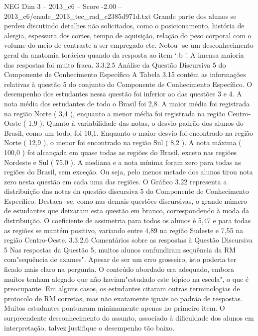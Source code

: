 \begin{textsample}{NEG Dim 3 – 2013\_c6 – Score -2.00 – 2013\_c6/enade\_2013\_tec\_rad\_c2385d971d.txt}
Grande parte dos alunos se perdeu discutindo detalhes não solicitados, como o posicionamento, história de alergia, espessura dos cortes, tempo de aquisição, relação do peso corporal com o volume do meio de contraste a ser empregado etc.
Notou -se um desconhecimento geral da anatomia torácica quando da resposta ao item ‘ b ’.
A imensa maioria das respostas foi muito fraca. 3.3.2.5 Análise da Questão Discursiva 5 do Componente de Conhecimento Específico A Tabela 3.15 contém as informações relativas à questão 5 do conjunto do Componente de Conhecimento Específico.
O desempenho dos estudantes nessa questão foi inferior ao das questões 3 e 4.
A nota média dos estudantes de todo o Brasil foi 2,8.
A maior média foi registrada na região Norte ( 3,4 ), enquanto a menor média foi registrada na região Centro-Oeste ( 1,9 ).
Quanto à variabilidade das notas, o desvio padrão dos alunos do Brasil, como um todo, foi 10,1.
Enquanto o maior desvio foi encontrado na região Norte ( 12,9 ), o menor foi encontrado na região Sul ( 8,2 ).
A nota máxima ( 100,0 ) foi alcançada em quase todas as regiões do Brasil, exceto nas regiões Nordeste e Sul ( 75,0 ).
A mediana e a nota mínima foram zero para todas as regiões do Brasil, sem exceção.
Ou seja, pelo menos metade dos alunos tirou nota zero nesta questão em cada uma das regiões.
O Gráfico 3.22 representa a distribuição das notas da questão discursiva 5 do Componente de Conhecimento Específico.
Destaca -se, como nas demais questões discursivas, o grande número de estudantes que deixaram esta questão em branco, correspondendo à moda da distribuição.
O coeficiente de assimetria para todos os alunos é 5,47 e para todas as regiões se mantém positivo, variando entre 4,89 na região Sudeste e 7,55 na região Centro-Oeste. 3.3.2.6 Comentários sobre as respostas à Questão Discursiva 5 Nas respostas da Questão 5, muitos alunos confundiram sequência da RM com"sequência de exames".
Apesar de ser um erro grosseiro, isto poderia ter ficado mais claro na pergunta.
O conteúdo abordado era adequado, embora muitos tenham alegado que não haviam"estudado este tópico na escola", o que é preocupante.
Em alguns casos, os estudantes citaram outras terminologias de protocolo de RM corretas, mas não exatamente iguais ao padrão de respostas.
Muitos estudantes pontuaram minimamente apenas no primeiro item.
O surpreendente desconhecimento do assunto, associado à dificuldade dos alunos em interpretação, talvez justifique o desempenho tão baixo.

\end{textsample}
